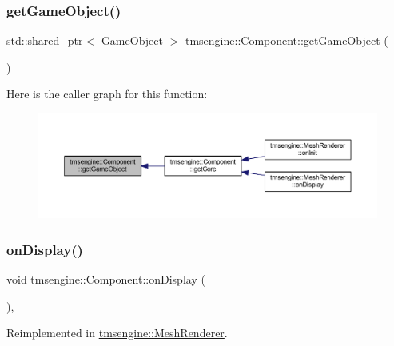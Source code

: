 \subsubsection{\texorpdfstring{get\+Game\+Object()}{getGameObject()}}
{\footnotesize\ttfamily std\+::shared\+\_\+ptr$<$ \hyperlink{classtmsengine_1_1_game_object}{Game\+Object} $>$ tmsengine\+::\+Component\+::get\+Game\+Object (\begin{DoxyParamCaption}{ }\end{DoxyParamCaption})}

Here is the caller graph for this function\+:\nopagebreak
\begin{figure}[H]
\begin{center}
\leavevmode
\includegraphics[width=350pt]{classtmsengine_1_1_component_a3df74e0c90f7519e3a9ab541dc77068a_icgraph}
\end{center}
\end{figure}
\mbox{\label{classtmsengine_1_1_component_a73aa3564db299ef43100bd58d7cab65b}} 
\subsubsection{\texorpdfstring{on\+Display()}{onDisplay()}}
{\footnotesize\ttfamily void tmsengine\+::\+Component\+::on\+Display (\begin{DoxyParamCaption}{ }\end{DoxyParamCaption})\hspace{0.3cm}{\ttfamily [private]}, {\ttfamily [virtual]}}



Reimplemented in \hyperlink{classtmsengine_1_1_mesh_renderer_adf77a2164ad1c92e4a310b99624b9fb5}{tmsengine\+::\+Mesh\+Renderer}.

\mbox{\label{classtmsengine_1_1_component_ae992e9b0c98b569eba13d0274089bc18}} 
